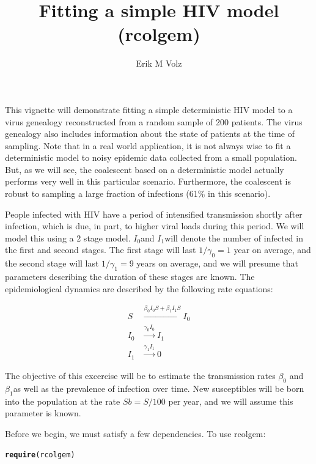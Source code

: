 \documentclass[english]{article}\usepackage[]{graphicx}\usepackage[]{color}
\makeatletter
\newcommand{\hlstd}[1]{\textcolor[rgb]{0.345,0.345,0.345}{#1}}%
\newcommand{\hlkwd}[1]{\textcolor[rgb]{0.737,0.353,0.396}{\textbf{#1}}}%
\newenvironment{kframe}{%
 \def\at@end@of@kframe{}%
 \ifinner\ifhmode%
  \def\at@end@of@kframe{\end{minipage}}%
  \begin{minipage}{\columnwidth}%
 \fi\fi%
 \def\FrameCommand##1{\hskip\@totalleftmargin \hskip-\fboxsep
 \colorbox{shadecolor}{##1}\hskip-\fboxsep
     \hskip-\linewidth \hskip-\@totalleftmargin \hskip\columnwidth}%
 \MakeFramed {\advance\hsize-\width
   \@totalleftmargin\z@ \linewidth\hsize
   \@setminipage}}%
 {\par\unskip\endMakeFramed%
 \at@end@of@kframe}
\newenvironment{knitrout}{}{} %
\makeatother
\begin{document}
\title{Fitting a simple HIV model (rcolgem)}


\author{Erik M Volz}

\maketitle
This vignette will demonstrate fitting a simple deterministic HIV
model to a virus genealogy reconstructed from a random sample of 200
patients. The virus genealogy also includes information about the
state of patients at the time of sampling. Note that in a real world
application, it is not always wise to fit a deterministic model to
noisy epidemic data collected from a small population. But, as we
will see, the coalescent based on a deterministic model actually performs
very well in this particular scenario. Furthermore, the coalescent
is robust to sampling a large fraction of infections (61\% in this
scenario). 

People infected with HIV have a period of intensified transmission
shortly after infection, which is due, in part, to higher viral loads
during this period. We will model this using a 2 stage model. $I_{0}$and
$I_{1}$will denote the number of infected in the first and second
stages. The first stage will last $1/\gamma_{0}=1$ year on average,
and the second stage will last $1/\gamma_{1}=9$ years on average,
and we will presume that parameters describing the duration of these
stages are known. The epidemiological dynamics are described by the
following rate equations: 

\begin{align}
S & \xrightarrow{\beta_0 I_0 S + \beta_1 I_1 S} I_0 \\
I_0 &\xrightarrow{ \gamma_0 I_0 } I_1 \\
I_1 &\xrightarrow{ \gamma_1 I_1 } 0 
\end{align}

The objective of this excercise will be to estimate the transmission
rates $\beta_{0}$ and $\beta_{1}$as well as the prevalence of infection
over time. New susceptibles will be born into the population at the
rate $Sb=S/100$ per year, and we will assume this parameter is known. 

Before we begin, we must satisfy a few dependencies. To use rcolgem: 

\begin{knitrout}
\color{fgcolor}\begin{kframe}
\begin{alltt}
\hlkwd{require}\hlstd{(rcolgem)}
\end{alltt}


{\ttfamily\noindent\itshape\color{messagecolor}{\#\# Loading required package: rcolgem}}\end{kframe}
\end{knitrout}
\end{document}
